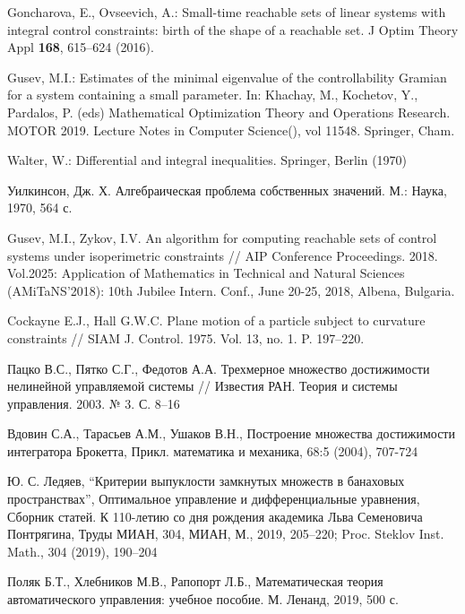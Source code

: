 \documentclass[../main.tex]{subfiles}
\begin{document}
\begin{thebibliography}{99}
Goncharova, E., Ovseevich, A.: Small-time reachable sets of linear systems with integral control constraints: birth of the shape of a reachable set. J Optim Theory Appl \textbf{168}, 615--624 (2016).

Gusev, M.I.: Estimates of the minimal eigenvalue of the controllability Gramian for a system containing a small parameter.  In: 
Khachay, M., Kochetov, Y., Pardalos, P. (eds) Mathematical Optimization Theory and Operations Research. MOTOR 
2019. Lecture Notes in Computer Science(), vol 11548. Springer, Cham. 

Walter, W.: Differential and integral inequalities. Springer, Berlin (1970)

Уилкинсон, Дж. Х.
Алгебраическая проблема собственных значений.
М.: Наука, 1970, 564 с.

Gusev, M.I., Zykov, I.V.
An algorithm for computing reachable sets of control systems under isoperimetric constraints // AIP Conference Proceedings. 
2018. 
Vol.2025: Application of Mathematics in Technical and Natural Sciences 
(AMiTaNS'2018): 10th Jubilee Intern. Conf.,
 June 20-25, 2018, Albena, Bulgaria.

 Cockayne E.J., Hall G.W.C. Plane motion of a particle subject to curvature constraints // SIAM J. Control. 1975. Vol. 13, no. 1. P. 197--220.  

 Пацко В.С., Пятко С.Г., Федотов А.А. Трехмерное множество достижимости нелинейной управляемой системы // Известия РАН. Теория и системы управления. 2003. № 3. С. 8--16

 Вдовин С.А., Тарасьев А.М., Ушаков В.Н., Построение множества достижимости интегратора Брокетта, Прикл. математика и механика, 68:5 (2004), 707-724

 Ю. С. Ледяев, “Критерии выпуклости замкнутых множеств в банаховых пространствах”, Оптимальное управление и дифференциальные уравнения, Сборник статей. К 110-летию со дня рождения академика Льва Семеновича Понтрягина, Труды МИАН, 304, МИАН, М., 2019, 205–220; Proc. Steklov Inst. Math., 304 (2019), 190–204
 

 Поляк Б.Т., Хлебников М.В., Рапопорт Л.Б., Математическая теория автоматического управления: учебное пособие. М. Ленанд, 2019, 500 с.


\end{thebibliography}
\end{document}
